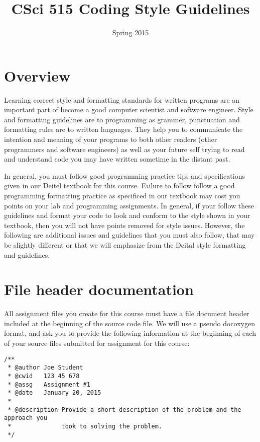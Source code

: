 \documentclass[11pt]{article}
\date{Spring 2015}
\title{CSci 515 Coding Style Guidelines}
\begin{document}
\maketitle

\section*{Overview}
\label{sec-1}

Learning correct style and formatting standards for written programs
are an important part of become a good computer scientist and software
engineer.  Style and formatting guidelines are to programming as
grammer, punctuation and formatting rules are to written languages.
They help you to communicate the intention and meaning of your
programs to both other readers (other programmers and software
engineers) as well as your future self trying to read and understand
code you may have written sometime in the distant past.

In general, you must follow good programming practice tips and
specifications given in our Deitel textbook for this course.  Failure
to follow follow a good programming formatting practice as specificed
in our textbook may cost you points on your lab and programming
assignments.  In general, if your follow these guidelines and format
your code to look and conform to the style shown in your textbook,
then you will not have points removed for style issues.  However, the
following are additional issues and guidelines that you must also
follow, that may be slightly different or that we will emphasize from
the Deital style formatting and guidelines.
\section*{File header documentation}
\label{sec-2}

All assignment files you create for this course must have a file
document header included at the beginning of the source code file.  We
will use a pseudo docoxygen format, and ask you to provide the
following information at the beginning of each of your source files
submitted for assignment for this course:

\begin{verbatim}
/** 
 * @author Joe Student
 * @cwid   123 45 678
 * @assg   Assignment #1
 * @date   January 20, 2015
 *
 * @description Provide a short description of the problem and the approach you 
 *              took to solving the problem.
 */
\end{verbatim}
\end{document}
